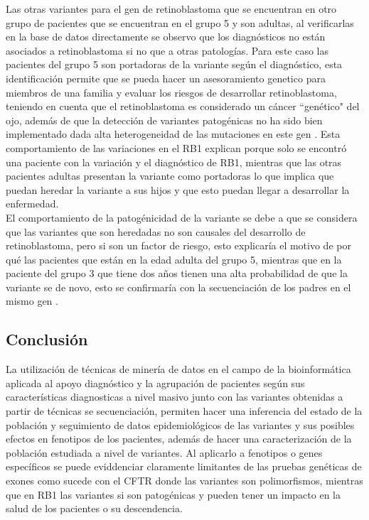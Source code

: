 Las otras variantes para el gen de retinoblastoma que se encuentran en otro grupo de pacientes  que se encuentran en el grupo 5 y son adultas, al verificarlas en la base de datos directamente se observo que los diagnósticos no están asociados a retinoblastoma si no que a otras patologías. Para este caso las pacientes del grupo 5 son portadoras de la variante según el diagnóstico, esta identificación permite que se pueda hacer un asesoramiento genetico para miembros de una familia y evaluar los riesgos de desarrollar retinoblastoma, teniendo en cuenta que el retinoblastoma es considerado un cáncer ``genético" del ojo, además de que la detección de variantes patogénicas no ha sido bien implementado dada alta heterogeneidad de las mutaciones en este gen \cite{Yousef2018}. Esta comportamiento de las  variaciones en el RB1 explican porque solo se encontró una paciente con la variación y el diagnóstico de RB1, mientras que las otras pacientes adultas presentan la variante como portadoras lo que implica que puedan heredar la variante a sus hijos y que esto puedan llegar a desarrollar la enfermedad.\\ 

El comportamiento de la patogénicidad de la variante se debe a que se considera que las variantes que son heredadas no son causales del desarrollo de retinoblastoma, pero si son un factor de riesgo, esto explicaría el motivo de por qué  las pacientes que están en la edad adulta del grupo 5, mientras que en la paciente del grupo 3 que tiene dos años tienen una alta probabilidad de que la variante se de novo, esto se confirmaría con la secuenciación de los padres en el mismo gen \cite{Parma2017}. \\

\subsection{Conclusión}

La utilización de técnicas de minería de datos en el campo de la bioinformática aplicada al apoyo diagnóstico y  la agrupación de pacientes según sus características diagnosticas a nivel masivo junto con las variantes obtenidas a partir de técnicas se secuenciación, permiten hacer una inferencia del estado de la población y seguimiento de datos epidemiológicos de las variantes y sus posibles efectos en fenotipos de los pacientes, además de hacer una caracterización de la población estudiada a nivel de variantes. Al aplicarlo a fenotipos o genes específicos se puede eviddenciar claramente limitantes de las pruebas genéticas de exones como sucede con el CFTR donde las variantes son polimorfismos, mientras que en RB1 las variantes si son patogénicas y pueden tener un impacto en la salud de los pacientes o su descendencia.  


